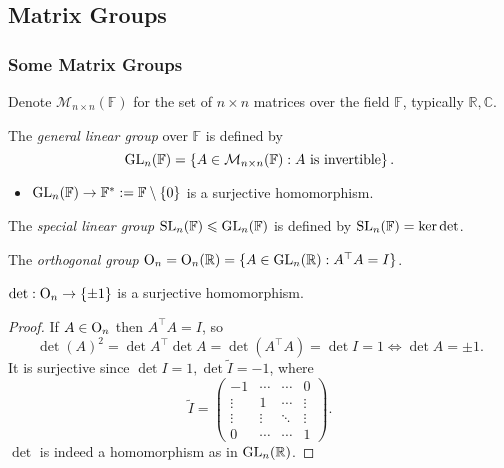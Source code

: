 \documentclass[a4paper]{article}
\begin{document}
\subsection{Matrix Groups}
\subsubsection{Some Matrix Groups}
Denote $ \mathcal{M}_{n\times n}(\mathbb{F}) $ for the set of $ n
\times n $ matrices over the field $\mathbb{F}$, typically
$\mathbb{R},\mathbb{C}$.

\begin{definition}
  The \textit{general linear group} over $\mathbb{F}$ is defined by
  \[
    \mathrm{GL}_n(\mathbb{F})=\left\{ A\in \mathcal{M}_{n\times
    n}(\mathbb{F}):A \text{ is invertible} \right\}.
  \]
\end{definition}
\begin{proposition}
  \begin{itemize}
    \item $ \mathrm{GL}_n(\mathbb{F}) \to \mathbb{F}^*:=\mathbb{F} \setminus
      \{0\} $ is a surjective homomorphism.
  \end{itemize}
\end{proposition}
\begin{definition}
  The \textit{special linear group} $ \mathrm{SL}_n(\mathbb{F}) \leqslant
  \mathrm{GL}_n(\mathbb{F}) $ is defined by $ \mathrm{SL}_n(\mathbb{F}) = \ker \det $.
\end{definition}
\begin{definition}
  The \textit{orthogonal group} $ \mathrm{O}_n=\mathrm{O}_n(\mathbb{R})=\{A\in
  \mathrm{GL}_n(\mathbb{R}): A^\top A=I\} $.
\end{definition}
\begin{proposition}\label{prop:7.4}
  $ \det : \mathrm{O}_n\to \left\{ \pm 1 \right\} $ is a surjective homomorphism.
\end{proposition}
\begin{proof}
  If $A\in \mathrm{O}_n$ then $A^\top A=I$, so
  \[
    \det (A)^2=\det A^\top \det A = \det (A^\top A)=\det I=1
    \Longleftrightarrow \det A=\pm 1.
  \]
  It is surjective since $ \det I=1, \det \tilde{I}=-1 $, where
  \[
    \tilde{I}=
    \begin{pmatrix}
      -1&\cdots &\cdots &0\\
      \vdots &1& \cdots &\vdots \\
      \vdots &\vdots &\ddots &\vdots \\
      0&\cdots&\cdots &1
    \end{pmatrix}.
  \]
  $ \det  $ is indeed a homomorphism as in $ \mathrm{GL}_n(\mathbb{R}) $.
\end{proof}
\end{document}
